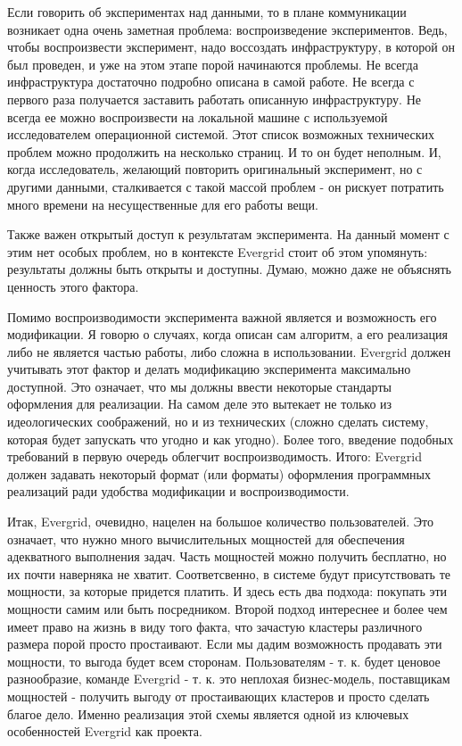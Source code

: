 Если говорить об экспериментах над данными, то в плане коммуникации возникает одна очень заметная проблема: воспроизведение экспериментов. Ведь, чтобы воспроизвести эксперимент, надо воссоздать инфраструктуру, в которой он был проведен, и уже на этом этапе порой начинаются проблемы. Не всегда инфраструктура достаточно подробно описана в самой работе. Не всегда с первого раза получается заставить работать описанную инфраструктуру. Не всегда ее можно воспроизвести на локальной машине с используемой исследователем операционной системой. Этот список возможных технических проблем можно продолжить на несколько страниц. И то он будет неполным. И, когда исследователь, желающий повторить оригинальный эксперимент, но с другими данными, сталкивается с такой массой проблем - он рискует потратить много времени на несущественные для его работы вещи.

Также важен открытый доступ к результатам эксперимента. На данный момент с этим нет особых проблем, но в контексте Evergrid стоит об этом упомянуть: результаты должны быть открыты и доступны. Думаю, можно даже не объяснять ценность этого фактора.

Помимо воспроизводимости эксперимента важной является и возможность его модификации. Я говорю о случаях, когда описан сам алгоритм, а его реализация либо не является частью работы, либо сложна в использовании. Evergrid должен учитывать этот фактор и делать модификацию эксперимента максимально доступной. Это означает, что мы должны ввести некоторые стандарты оформления для реализации. На самом деле это вытекает не только из идеологических соображений, но и из технических (сложно сделать систему, которая будет запускать что угодно и как угодно). Более того, введение подобных требований в первую очередь облегчит воспроизводимость. Итого: Evergrid должен задавать некоторый формат (или форматы) оформления программных реализаций ради удобства модификации и воспроизводимости.

Итак, Evergrid, очевидно, нацелен на большое количество пользователей. Это означает, что нужно много вычислительных мощностей для обеспечения адекватного выполнения задач. Часть мощностей можно получить бесплатно, но их почти наверняка не хватит. Соответсвенно, в системе будут присутствовать те мощности, за которые придется платить. И здесь есть два подхода: покупать эти мощности самим или быть посредником. Второй подход интереснее и более чем имеет право на жизнь в виду того факта, что зачастую кластеры различного размера порой просто простаивают. Если мы дадим возможность продавать эти мощности, то выгода будет всем сторонам. Пользователям - т. к. будет ценовое разнообразие, команде Evergrid - т. к. это неплохая бизнес-модель, поставщикам мощностей - получить выгоду от простаивающих кластеров и просто сделать благое дело. Именно реализация этой схемы является одной из ключевых особенностей Evergrid как проекта.

